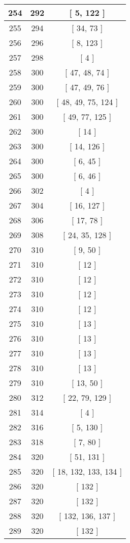 \begin{center}
\begin{longtable}[H]{|| c c c ||}
\hline
254 & 292 & [ 5, 122 ] \\ 
\hline
255 & 294 & [ 34, 73 ] \\ 
\hline
256 & 296 & [ 8, 123 ] \\ 
\hline
257 & 298 & [ 4 ] \\ 
\hline
258 & 300 & [ 47, 48, 74 ] \\ 
\hline
259 & 300 & [ 47, 49, 76 ] \\ 
\hline
260 & 300 & [ 48, 49, 75, 124 ] \\ 
\hline
261 & 300 & [ 49, 77, 125 ] \\ 
\hline
262 & 300 & [ 14 ] \\ 
\hline
263 & 300 & [ 14, 126 ] \\ 
\hline
264 & 300 & [ 6, 45 ] \\ 
\hline
265 & 300 & [ 6, 46 ] \\ 
\hline
266 & 302 & [ 4 ] \\ 
\hline
267 & 304 & [ 16, 127 ] \\ 
\hline
268 & 306 & [ 17, 78 ] \\ 
\hline
269 & 308 & [ 24, 35, 128 ] \\ 
\hline
270 & 310 & [ 9, 50 ] \\ 
\hline
271 & 310 & [ 12 ] \\ 
\hline
272 & 310 & [ 12 ] \\ 
\hline
273 & 310 & [ 12 ] \\ 
\hline
274 & 310 & [ 12 ] \\ 
\hline
275 & 310 & [ 13 ] \\ 
\hline
276 & 310 & [ 13 ] \\ 
\hline
277 & 310 & [ 13 ] \\ 
\hline
278 & 310 & [ 13 ] \\ 
\hline
279 & 310 & [ 13, 50 ] \\ 
\hline
280 & 312 & [ 22, 79, 129 ] \\ 
\hline
281 & 314 & [ 4 ] \\ 
\hline
282 & 316 & [ 5, 130 ] \\ 
\hline
283 & 318 & [ 7, 80 ] \\ 
\hline
284 & 320 & [ 51, 131 ] \\ 
\hline
285 & 320 & [ 18, 132, 133, 134 ] \\ 
\hline
286 & 320 & [ 132 ] \\ 
\hline
287 & 320 & [ 132 ] \\ 
\hline
288 & 320 & [ 132, 136, 137 ] \\ 
\hline
289 & 320 & [ 132 ] \\ 

\end{longtable}
\end{center}
